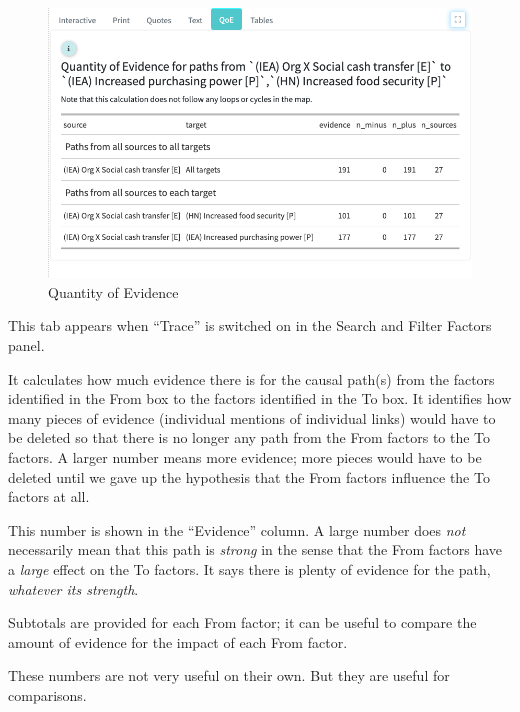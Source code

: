 \documentclass[
]{book}
\begin{document}
\begin{figure}
\centering
\includegraphics{_assets/qoe.png}
\caption{Quantity of Evidence}
\end{figure}

This tab appears when ``Trace'' is switched on in the Search and Filter Factors panel.

It calculates how much evidence there is for the causal path(s) from the factors identified in the From box to the factors identified in the To box. It identifies how many pieces of evidence (individual mentions of individual links) would have to be deleted so that there is no longer any path from the From factors to the To factors. A larger number means more evidence; more pieces would have to be deleted until we gave up the hypothesis that the From factors influence the To factors at all.

This number is shown in the ``Evidence'' column. A large number does \emph{not} necessarily mean that this path is \emph{strong} in the sense that the From factors have a \emph{large} effect on the To factors. It says there is plenty of evidence for the path, \emph{whatever its strength}.

Subtotals are provided for each From factor; it can be useful to compare the amount of evidence for the impact of each From factor.

These numbers are not very useful on their own. But they are useful for comparisons.
\end{document}
